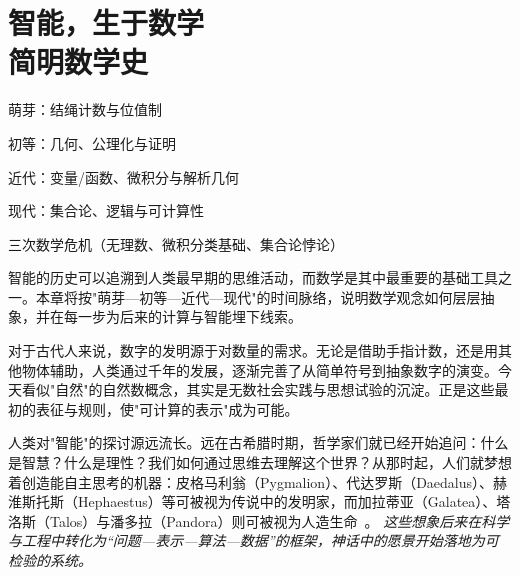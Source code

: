 \chapter{智能，生于数学 \texorpdfstring{\\}{ }简明数学史}
\newenvironment{examplebox}
{\par\vspace{0.5em}\noindent\hrulefill\par\noindent{示例盒子：三跳链}\par\small}
{\par\noindent\hrulefill\vspace{0.5em}\normalsize\par}

\begin{introduction}
\item 萌芽：结绳计数与位值制
\item 初等：几何、公理化与证明
\item 近代：变量/函数、微积分与解析几何
\item 现代：集合论、逻辑与可计算性
\item 三次数学危机（无理数、微积分类基础、集合论悖论）

\end{introduction}


智能的历史可以追溯到人类最早期的思维活动，而数学是其中最重要的基础工具之一。本章将按"萌芽—初等—近代—现代"的时间脉络，说明数学观念如何层层抽象，并在每一步为后来的计算与智能埋下线索。

对于古代人来说，数字的发明源于对数量的需求。无论是借助手指计数，还是用其他物体辅助，人类通过千年的发展，逐渐完善了从简单符号到抽象数字的演变。今天看似"自然"的自然数概念，其实是无数社会实践与思想试验的沉淀。正是这些最初的表征与规则，使"可计算的表示"成为可能。

人类对"智能"的探讨源远流长。远在古希腊时期，哲学家们就已经开始追问：什么是智慧？什么是理性？我们如何通过思维去理解这个世界？从那时起，人们就梦想着创造能自主思考的机器：皮格马利翁（Pygmalion）、代达罗斯（Daedalus）、赫淮斯托斯（Hephaestus）等可被视为传说中的发明家，而加拉蒂亚（Galatea）、塔洛斯（Talos）与潘多拉（Pandora）则可被视为人造生命~{\cite{OvidMartin2004,Sparkes1996,Tandy1997}}。 \emph{这些想象后来在科学与工程中转化为“问题—表示—算法—数据”的框架，神话中的愿景开始落地为可检验的系统。}

